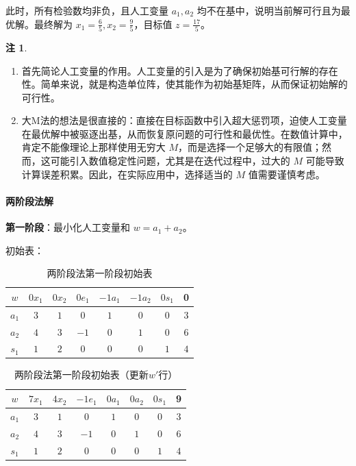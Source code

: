 \documentclass[12pt]{article}
\theoremstyle{plain}
\theoremstyle{definition}
\newtheorem{rmk}{注}[subsection]
\begin{document}
此时，所有检验数均非负，且人工变量 $a_1, a_2$ 均不在基中，说明当前解可行且为最优解。最终解为 $x_1 = \frac{6}{5}, x_2 = \frac{9}{5}$，目标值 $z = \frac{17}{5}$。
\begin{rmk}
    \begin{enumerate}
        \item 首先简论人工变量的作用。人工变量的引入是为了确保初始基可行解的存在性。简单来说，就是构造单位阵，使其能作为初始基矩阵，从而保证初始解的可行性。
        \item 大M法的想法是很直接的：直接在目标函数中引入超大惩罚项，迫使人工变量在最优解中被驱逐出基，从而恢复原问题的可行性和最优性。在数值计算中，肯定不能像理论上那样使用无穷大 $M$，而是选择一个足够大的有限值；然而，这可能引入数值稳定性问题，尤其是在迭代过程中，过大的 $M$ 可能导致计算误差积累。因此，在实际应用中，选择适当的 $M$ 值需要谨慎考虑。
    \end{enumerate}
\end{rmk}

\paragraph{两阶段法解}
\textbf{第一阶段}：最小化人工变量和 $w = a_1 + a_2$。

初始表：
\begin{table}[!htbp]
    \centering
    \caption{两阶段法第一阶段初始表}
    \begin{tabular}{c|cccccc|c}
        \hline
        $w$ & $0x_1$ & $0x_2$ & $0e_1$ & $-1a_1$ & $-1a_2$ & $0s_1$ & 0 \\
        \hline
        $a_1$ & $3$ & $1$ & $0$ & $1$ & $0$ & $0$ & $3$\\
        $a_2$ & $4$ & $3$ & $-1$ & $0$ & $1$ & $0$ & $6$\\
        $s_1$ & $1$ & $2$ & $0$ & $0$ & $0$ & $1$ & $4$\\
        \hline
    \end{tabular}
\end{table}
\begin{table}[!htbp]
    \centering
    \caption{两阶段法第一阶段初始表（更新$w'$行）}
    \begin{tabular}{c|cccccc|c}
        \hline
        $w$ & $7x_1$ & $4x_2$ & $-1e_1$ & $0a_1$ & $0a_2$ & $0s_1$ & 9\\
        \hline
        $a_1$ & $3$ & $1$ & $0$ & $1$ & $0$ & $0$ & $3$\\
        $a_2$ & $4$ & $3$ & $-1$ & $0$ & $1$ & $0$ & $6$\\
        $s_1$ & $1$ & $2$ & $0$ & $0$ & $0$ & $1$ & $4$\\
        \hline
    \end{tabular}
\end{table}
\end{document}

